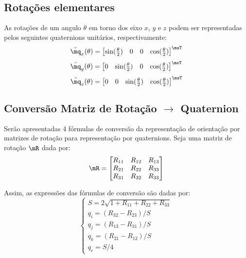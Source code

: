 \documentclass[]{politex}
\begin{document}
\subsection{Rotações elementares}
As rotações de um angulo $\theta$ em torno dos eixo $x$, $y$ e $z$ podem ser representadas pelos seguintes quaternions unitários, respectivamente:
\begin{equation}
\breve{\mq}_x (\theta) = \begin{bmatrix}
\sin(\frac{\theta}{2}) & 0 & 0 & \cos(\frac{\theta}{2})
\end{bmatrix}^\msT
\end{equation}
\begin{equation}
\breve{\mq}_y (\theta) = \begin{bmatrix}
0 & \sin(\frac{\theta}{2}) & 0 & \cos(\frac{\theta}{2})
\end{bmatrix}^\msT
\end{equation}
\begin{equation}
\breve{\mq}_z (\theta) = \begin{bmatrix}
0 & 0 & \sin(\frac{\theta}{2}) & \cos(\frac{\theta}{2})
\end{bmatrix}^\msT
\end{equation}

\subsection{Conversão Matriz de Rotação $\rightarrow$ Quaternion}

Serão apresentadas 4 fórmulas de conversão da representação de orientação por matrizes de rotação para representação por quaternions. Seja uma matriz de rotação $\mR$ dada por:
\begin{equation}
\mR = \begin{bmatrix}
R_{11} & R_{12} & R_{13} \\
R_{21} & R_{22} & R_{33} \\
R_{31} & R_{32} & R_{33} \\
\end{bmatrix}
\end{equation}

Assim, as expressões das fórmulas de conversão são dadas por:
\begin{equation}
\begin{cases} \label{eq:Matriz2Quat0}
S = 2 \sqrt{1 + R_{11} + R_{22} + R_{33}} \\
q_i = (R_{32} - R_{23})/S \\
q_j = (R_{13} - R_{31})/S \\
q_k = (R_{21} - R_{12})/S \\
q_r = S/4
\end{cases}
\end{equation}
\end{document}
